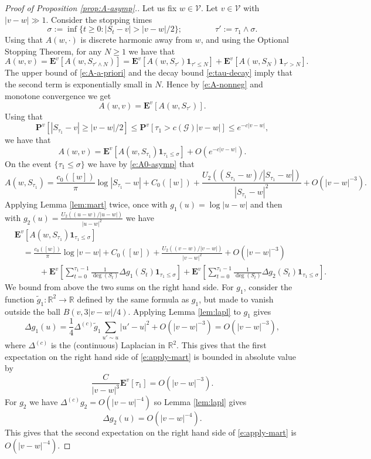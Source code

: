 \documentclass[11pt]{article}
\theoremstyle{remark}
\def\E{\mathbf{E}}
\def\R{\mathbb{R}}
\def\Pr{\mathbf{P}}
\def\cG{\mathcal{G}}
\def\cV{\mathcal{V}}
\newcommand{\eqnst}[1]{\begin{equation*}#1\end{equation*}}
\newcommand{\eqnspl}[2]{\begin{equation}\begin{split}\label{#1}%
   #2\end{split}\end{equation}}
\begin{document}
\begin{proof}[Proof of Proposition \ref{prop:A-asymp}.]
Let us fix $w \in \cV$. Let $v \in \cV$ with $|v - w| \gg 1$. Consider the stopping times
\eqnst{
  \sigma
  := \inf \{ t \ge 0 : | S_t - v | > |v-w|/2 \}; \qquad\qquad
  \tau'
  := \tau_1 \wedge \sigma. }
Using that $A(w,\cdot)$ is discrete harmonic away from $w$, and using the Optional 
Stopping Theorem, for any $N \ge 1$ we have that
\eqnst{
  A(w,v)
  = \E^v \left[ A(w,S_{\tau' \wedge N}) \right]
  = \E^v \left[ A(w,S_{\tau'}) \mathbf{1}_{\tau' \le N} \right]
    + \E^v \left[ A(w,S_{N}) \mathbf{1}_{\tau' > N} \right]. }
The upper bound of \eqref{e:A-a-priori} and the decay bound
\eqref{e:tau-decay} imply that the second term is exponentially small in $N$. 
Hence by \eqref{e:A-nonneg} and monotone convergence we get
\eqnst{
  A(w,v)
  = \E^v \left[ A(w,S_{\tau'}) \right]. }
Using that 
\eqnst{
  \Pr^v [ |S_{\tau_1} - v| \ge |v - w|/2 ]
  \le \Pr^v [ \tau_1 > c(\cG) |v - w|]
  \le e^{- c |v - w|}, }
we have that
\eqnst{
  A(w,v)
  = \E^v \left[ A(w,S_{\tau_1}) \mathbf{1}_{\tau_1 \le \sigma} \right]
    + O \left( e^{- c |v - w|} \right). }
On the event $\{ \tau_1 \le \sigma \}$ we have by \eqref{e:A0-asymp} that
\eqnst{
  A(w,S_{\tau_1})
  = \frac{c_0([w])}{\pi} \log |S_{\tau_1} - w| + C_0([w]) 
    + \frac{U_2((S_{\tau_1} - w)/|S_{\tau_1} - w|)}{|S_{\tau_1} - w|^2} 
    + O \left( |v - w|^{-3} \right). }
Applying Lemma \ref{lem:mart} twice, once with $g_1(u) = \log| u - w |$ and then with 
$g_2(u) = \frac{U_2((u - w)/|u - w|)}{|u - w|^2}$ we have 
\eqnspl{e:apply-mart}{
  &\E^v \left[ A(w,S_{\tau_1}) \mathbf{1}_{\tau_1 \le \sigma} \right] \\
  &\quad = \frac{c_0([w])}{\pi} \log|v - w| + C_0([w]) 
     + \frac{U_2((v - w)/|v - w|)}{|v - w|^2} + O \left( |v - w|^{-3} \right) \\
  &\qquad\quad + \E^v \left[ \sum_{t=0}^{\tau_1-1} \frac{1}{\deg(S_t)} \Delta g_1(S_t) 
      \mathbf{1}_{\tau_1 \le \sigma} \right]
    + \E^v \left[ \sum_{t=0}^{\tau_1-1} \frac{1}{\deg(S_t)} \Delta g_2(S_t) 
      \mathbf{1}_{\tau_1 \le \sigma} \right]. }
We bound from above the two sums on the right hand side. For $g_1$, consider the function
$\tilde{g}_1 : \R^2 \to \R$ defined by the same formula as $g_1$, but made to vanish outside 
the ball $B(v, 3|v-w|/4)$. Applying Lemma \ref{lem:lapl} to $g_1$ gives 
\eqnst{
  \Delta g_1(u)
  = \frac{1}{4} \Delta^{(c)} \tilde{g}_1 \sum_{u' \sim u} |u' - u|^2 + O ( |v - w|^{-3} )
  = O ( |v - w|^{-3} ), }
where $\Delta^{(c)}$ is the (continuous) Laplacian in $\R^2$. This gives that the first
expectation on the right hand side of \eqref{e:apply-mart} is bounded in absolute value by
\eqnst{
  \frac{C}{|v-w|^3} \E^v [ \tau_1 ]
  = O ( |v - w|^{-3} ). }
For $g_2$ we have $\Delta^{(c)} g_2 = O(|v-w|^{-4})$ so Lemma \ref{lem:lapl} gives 
\eqnst{
  \Delta g_2(u)
  = O ( |v - w|^{-4} ). }
This gives that the second expectation on the right hand side of \eqref{e:apply-mart} is 
$O ( |v - w|^{-4} )$.


\end{proof}
\end{document}
